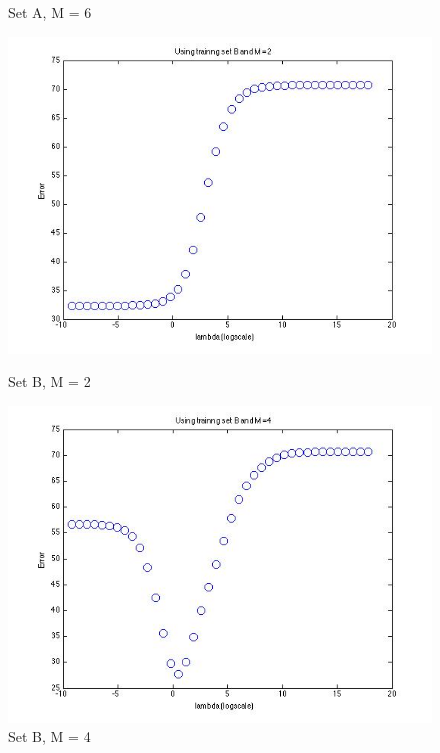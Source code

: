 \begin{figure}[!htb]
  \caption{Set A, M = 6}\label{fig:p3_regressA_m=6}
\endminipage
\end{figure}


\begin{figure}[!htb]
  \includegraphics[width=\linewidth]{figures/p3_regressB_m=2}
  \caption{Set B, M = 2}\label{fig:p3_regressB_m=2}
\endminipage\hfill
{}
  \includegraphics[width=\linewidth]{figures/p3_regressB_m=4}
  \caption{Set B, M = 4}\label{fig:p3_regressB_m=4}
\endminipage\hfill
{}%

\end{figure}
